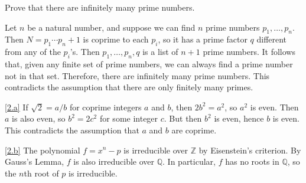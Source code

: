 \documentclass{homework}
\begin{document}
\maketitle

\begin{problem}[Euclid]
Prove that there are infinitely many prime numbers.
\end{problem}

\begin{solution}
Let $n$ be a natural number, and suppose we can find $n$ prime numbers $p_1, \ldots, p_n$.
Then $N = p_1 \cdots p_n + 1$ is coprime to each $p_i$, so it has a prime factor $q$ different from any of the $p_i$'s.
Then $p_1,\ldots,p_n,q$ is a list of $n+1$ prime numbers.
It follows that, given any finite set of prime numbers, we can always find a prime number not in that set.
Therefore, there are infinitely many prime numbers.
This contradicts the assumption that there are only finitely many primes.
\end{solution}

\begin{problem}
\end{problem}

\begin{solution}
\ref{2.a}
If $\sqrt 2 = a / b$ for coprime integers $a$ and $b$, then $2 b^2 = a^2$,
so $a^2$ is even.
Then $a$ is also even, so $b^2 = 2 c^2$ for some integer $c$.
But then $b^2$ is even, hence $b$ is even.
This contradicts the assumption that $a$ and $b$ are coprime.

\ref{2.b}
The polynomial $f = x^n - p$ is irreducible over $\mathbb{Z}$ by Eisenstein's
criterion.
By Gauss's Lemma, $f$ is also irreducible over $\mathbb{Q}$.
In particular, $f$ has no roots in $\mathbb Q$, so the $n$th root of $p$ is
irreducible.
\end{solution}
\end{document}
